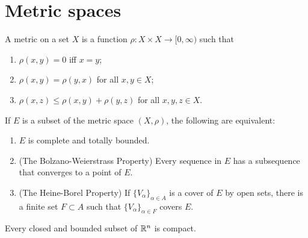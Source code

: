 \section{Metric spaces}

\begin{definition}[Metric]
A metric on a set $X$ is a function $\rho : X \times X \to [0, \infty)$ such that 
\begin{enumerate}
    \item $\rho(x, y) = 0$ iff $x = y$;
    \item $\rho(x, y) = \rho(y, x)$ for all $x, y \in X$;
    \item $\rho(x, z) \le \rho (x, y) + \rho(y, z)$ for all $x, y, z \in X$.
\end{enumerate}
\end{definition}

\begin{theorem}
If $E$ is a subset of the metric space $(X, \rho)$, the following are equivalent:
\begin{enumerate}
    \item $E$ is complete and totally bounded.
    \item (The Bolzano-Weierstrass Property) Every sequence in $E$ has a subsequence that converges to a point of $E$.
    \item (The Heine-Borel Property) If $\{ V_{\alpha} \}_{\alpha \in A}$ is a cover of $E$ by open sets, there is a finite set $F \subset A$ such that $\{ V_{\alpha} \}_{\alpha \in F}$ covers $E$.
\end{enumerate}
\end{theorem}

\begin{theorem}
Every closed and bounded subset of $\mathbb{R}^n$ is compact.
\end{theorem}